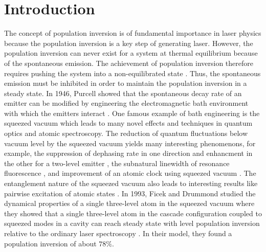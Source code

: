 \documentclass[aps,showpacs,twocolumn,twoside,groupedaddress]{revtex4}
\begin{document}
\section{Introduction}
The concept of population inversion is of fundamental importance in laser physics because the population inversion is a key step of generating laser. However, the population inversion can never exist for a system at thermal equilibrium because of the spontaneous emission. The achievement of population inversion therefore requires pushing the system into a non-equilibrated state  \cite{svelto1998principles}. Thus, the spontaneous emission must be inhibited in order to maintain the population inversion in a steady state. In 1946, Purcell showed that the spontaneous decay rate of an emitter can be modified by engineering the electromagnetic bath environment with which the emitters interact \cite{purcell1946purcell}. 
One famous example of bath engineering is the squeezed vacuum which leads to many novel effects and techniques in quantum optics and atomic spectroscopy. The reduction of quantum fluctuations below vacuum level by the squeezed vacuum yields many interesting phenomenons, for example, the suppression of dephasing rate in one direction and enhancment in the other for a two-level emitter \cite{gardiner1986cw, collett1984mj,gea1988vacuum,palma1989gm, agarwal1990cooperative, ficek1990spontaneous,ficek1991z, goldstein1996ev}, the subnatural linewidth of resonance fluorescence \cite{carmichael1987, toyli2016resonance}, and improvement of an atomic clock using squeezed vacuum \cite{Kruse}. The entanglement nature of the squeezed vacuum also leads to interesting results like pairwise excitation of atomic states \cite{tanas2004stationary, li2006preparing, You2018}. In 1993, Ficek and Drummond studied the dynamical properties of a single three-level atom in the squeezed vacuum where they showed that a single three-level atom in the cascade configuration coupled to squeezed modes in a cavity can reach steady state with level population inversion relative to the ordinary laser spectroscopy \cite{ficek1991three, ficek1991three2, ficek1993two}.  In their model, they found a population inversion of about $78\%$.

\end{document}

